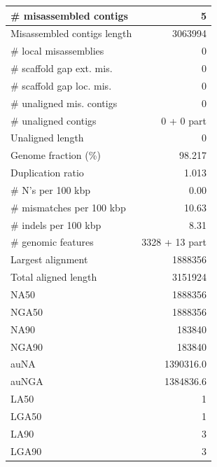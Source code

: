 \documentclass[12pt,a4paper]{article}
\begin{document}
\begin{table}[ht]
\begin{center}
\begin{tabular}{|l*{1}{|r}|}
\# misassembled contigs & 5 \\ \hline
Misassembled contigs length & 3063994 \\ \hline
\# local misassemblies & 0 \\ \hline
\# scaffold gap ext. mis. & 0 \\ \hline
\# scaffold gap loc. mis. & 0 \\ \hline
\# unaligned mis. contigs & 0 \\ \hline
\# unaligned contigs & 0 + 0 part \\ \hline
Unaligned length & 0 \\ \hline
Genome fraction (\%) & 98.217 \\ \hline
Duplication ratio & 1.013 \\ \hline
\# N's per 100 kbp & 0.00 \\ \hline
\# mismatches per 100 kbp & 10.63 \\ \hline
\# indels per 100 kbp & 8.31 \\ \hline
\# genomic features & 3328 + 13 part \\ \hline
Largest alignment & 1888356 \\ \hline
Total aligned length & 3151924 \\ \hline
NA50 & 1888356 \\ \hline
NGA50 & 1888356 \\ \hline
NA90 & 183840 \\ \hline
NGA90 & 183840 \\ \hline
auNA & 1390316.0 \\ \hline
auNGA & 1384836.6 \\ \hline
LA50 & 1 \\ \hline
LGA50 & 1 \\ \hline
LA90 & 3 \\ \hline
LGA90 & 3 \\ \hline
\end{tabular}
\end{center}
\end{table}
\end{document}
